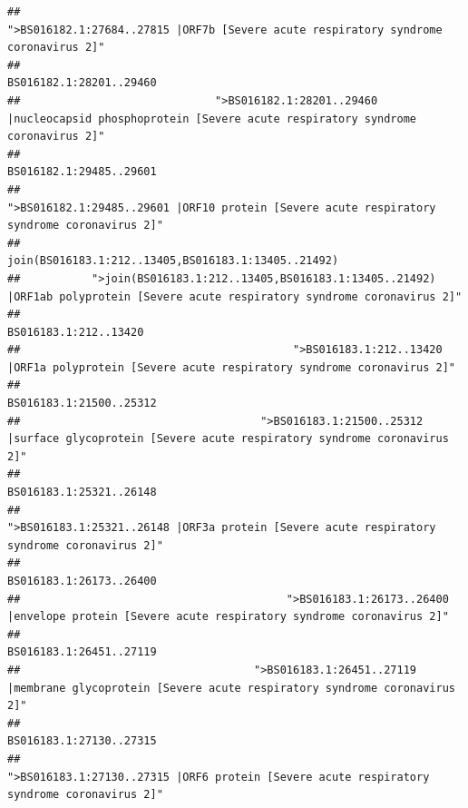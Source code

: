\documentclass[
]{article}
\begin{document}
\begin{verbatim}
##                                                    ">BS016182.1:27684..27815 |ORF7b [Severe acute respiratory syndrome coronavirus 2]" 
##                                                                                                                BS016182.1:28201..29460 
##                              ">BS016182.1:28201..29460 |nucleocapsid phosphoprotein [Severe acute respiratory syndrome coronavirus 2]" 
##                                                                                                                BS016182.1:29485..29601 
##                                            ">BS016182.1:29485..29601 |ORF10 protein [Severe acute respiratory syndrome coronavirus 2]" 
##                                                                                    join(BS016183.1:212..13405,BS016183.1:13405..21492) 
##           ">join(BS016183.1:212..13405,BS016183.1:13405..21492) |ORF1ab polyprotein [Severe acute respiratory syndrome coronavirus 2]" 
##                                                                                                                  BS016183.1:212..13420 
##                                          ">BS016183.1:212..13420 |ORF1a polyprotein [Severe acute respiratory syndrome coronavirus 2]" 
##                                                                                                                BS016183.1:21500..25312 
##                                     ">BS016183.1:21500..25312 |surface glycoprotein [Severe acute respiratory syndrome coronavirus 2]" 
##                                                                                                                BS016183.1:25321..26148 
##                                            ">BS016183.1:25321..26148 |ORF3a protein [Severe acute respiratory syndrome coronavirus 2]" 
##                                                                                                                BS016183.1:26173..26400 
##                                         ">BS016183.1:26173..26400 |envelope protein [Severe acute respiratory syndrome coronavirus 2]" 
##                                                                                                                BS016183.1:26451..27119 
##                                    ">BS016183.1:26451..27119 |membrane glycoprotein [Severe acute respiratory syndrome coronavirus 2]" 
##                                                                                                                BS016183.1:27130..27315 
##                                             ">BS016183.1:27130..27315 |ORF6 protein [Severe acute respiratory syndrome coronavirus 2]" 

\end{verbatim}
\end{document}
